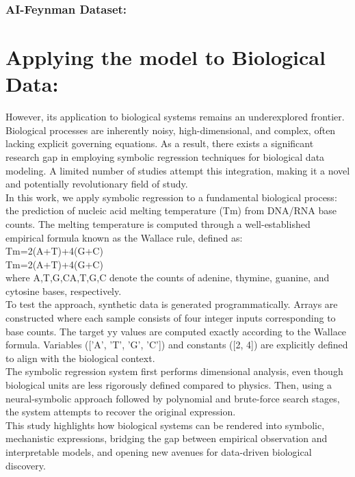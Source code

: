 \documentclass{article}
\begin{document}
\subsubsection{AI-Feynman Dataset: }


\section{ Applying the model to Biological Data: }

However, its application to biological systems remains an underexplored frontier. Biological processes are inherently noisy, high-dimensional, and complex, often lacking explicit governing equations. As a result, there exists a significant research gap in employing symbolic regression techniques for biological data modeling. A limited number of studies attempt this integration, making it a novel and potentially revolutionary field of study.\\

In this work, we apply symbolic regression to a fundamental biological process: the prediction of nucleic acid melting temperature (Tm) from DNA/RNA base counts. The melting temperature is computed through a well-established empirical formula known as the Wallace rule, defined as:\\
Tm=2(A+T)+4(G+C)\\
Tm=2(A+T)+4(G+C)\\

where A,T,G,CA,T,G,C denote the counts of adenine, thymine, guanine, and cytosine bases, respectively.\\

To test the approach, synthetic data is generated programmatically. Arrays are constructed where each sample consists of four integer inputs corresponding to base counts. The target yy values are computed exactly according to the Wallace formula. Variables (['A', 'T', 'G', 'C']) and constants ([2, 4]) are explicitly defined to align with the biological context.\\

The symbolic regression system first performs dimensional analysis, even though biological units are less rigorously defined compared to physics. Then, using a neural-symbolic approach followed by polynomial and brute-force search stages, the system attempts to recover the original expression.\\

This study highlights how biological systems can be rendered into symbolic, mechanistic expressions, bridging the gap between empirical observation and interpretable models, and opening new avenues for data-driven biological discovery.\\
\end{document}
